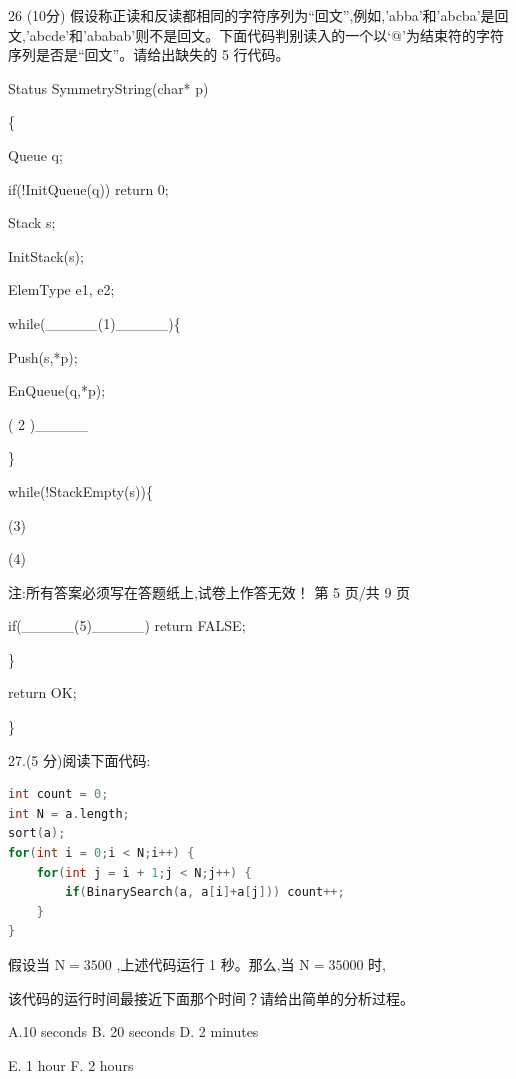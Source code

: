 26 (10分) 假设称正读和反读都相同的字符序列为“回文”,例如,'abba'和'abcba'是回文,'abcde'和'ababab'则不是回文。下面代码判别读入的一个以‘@’为结束符的字符序列是否是“回文”。请给出缺失的 5 行代码。

Status SymmetryString(char* p)

\{



Queue q;

if(!InitQueue(q)) return 0;

Stack s;

InitStack(s);

ElemType e1, e2;

while(\_\_\_\_\_(1)\_\_\_\_\_)\{

\hspace*{4em} Push(s,*p);

\hspace*{4em} EnQueue(q,*p);

\hspace*{7em} ( 2 )\_\_\_\_\_

\}

while(!StackEmpty(s))\{

\hspace*{8em} (3)

\hspace*{4em} (4)

注:所有答案必须写在答题纸上,试卷上作答无效！ 第 5 页/共 9 页

\hspace*{2em} if(\_\_\_\_\_(5)\_\_\_\_\_) return FALSE;

\hspace*{1em} \}

\hspace*{1em} return OK;

\}

27.(5 分)阅读下面代码:

\begin{lstlisting}[language=C, basicstyle=\ttfamily]
int count = 0;
int N = a.length;
sort(a);
for(int i = 0;i < N;i++) {
    for(int j = i + 1;j < N;j++) {
        if(BinarySearch(a, a[i]+a[j])) count++;
    }
}
\end{lstlisting}


假设当 \(\mathrm{N} = {3500}\) ,上述代码运行 1 秒。那么,当 \(\mathrm{N} = {35000}\) 时,

该代码的运行时间最接近下面那个时间？请给出简单的分析过程。

A.10 seconds B. 20 seconds D. 2 minutes

E. 1 hour F. 2 hours
\vspace{10em}

